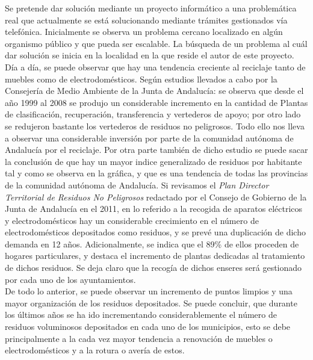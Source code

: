 Se pretende dar solución mediante un proyecto informático a una problemática real que actualmente se está solucionando mediante trámites gestionados vía telefónica. Inicialmente se observa un problema cercano localizado en algún organismo público y que pueda ser escalable. La búsqueda de un problema al cuál dar solución se inicia en la localidad en la que reside el autor de este proyecto. \\

Día a día, se puede observar que hay una tendencia creciente al reciclaje tanto de muebles como de electrodomésticos. Según estudios \cite{AndaluciaEcologica:web} llevados a cabo por la Consejería de Medio Ambiente de la Junta de Andalucía: se observa que desde el año 1999 al 2008 se produjo un considerable incremento en la cantidad de Plantas de clasificación, recuperación, transferencia y vertederos de apoyo; por otro lado se redujeron bastante los vertederos de residuos no peligrosos. Todo ello nos lleva a observar una considerable inversión por parte de la comunidad autónoma de Andalucía por el reciclaje. Por otra parte también de dicho estudio se puede sacar la conclusión de que hay un mayor indice generalizado de residuos por habitante tal y como se observa en la gráfica, y que es una tendencia de todas las provincias de la comunidad autónoma de Andalucía. Si revisamos el \textit{Plan Director Territorial de Residuos No Peligrosos}\cite{conserjeria_de_medio_ambiente_junta_de_andalucia_plan_2011} redactado por el Consejo de Gobierno de la Junta de Andalucía en el 2011, en lo referido a la recogida de aparatos eléctricos y electrodomésticos hay un considerable crecimiento en el número de electrodomésticos depositados como residuos, y se prevé una duplicación de dicho demanda en 12 años. Adicionalmente, se indica que el 89\% de ellos proceden de hogares particulares, y destaca el incremento de plantas dedicadas al tratamiento de dichos residuos. Se deja claro que la recogía de dichos enseres será gestionado por cada uno de los ayuntamientos. \\

De todo lo anterior, se puede observar un incremento de puntos limpios y una mayor organización de los residuos depositados. Se puede concluir, que durante los últimos años se ha ido incrementando considerablemente el número de residuos voluminosos depositados en cada uno de los municipios, esto se debe principalmente a la cada vez mayor tendencia a renovación de muebles o electrodomésticos y a la rotura o avería de estos. \\


